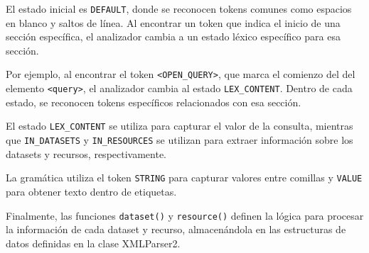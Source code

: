 
El estado inicial es \lstinline|DEFAULT|, donde se reconocen tokens comunes como espacios en blanco y saltos de línea. Al encontrar un token que indica el inicio de una sección específica, el analizador cambia a un estado léxico específico para esa sección.

Por ejemplo, al encontrar el token \lstinline|<OPEN_QUERY>|, que marca el comienzo del del elemento \lstinline|<query>|, el analizador cambia al estado \lstinline|LEX_CONTENT|. Dentro de cada estado, se reconocen tokens específicos relacionados con esa sección.

El estado \lstinline|LEX_CONTENT| se utiliza para capturar el valor de la consulta, mientras que \lstinline|IN_DATASETS| y \lstinline|IN_RESOURCES| se utilizan para extraer información sobre los datasets y recursos, respectivamente.


La gramática utiliza el token \lstinline|STRING| para capturar valores entre comillas y \lstinline|VALUE| para obtener texto dentro de etiquetas.

Finalmente, las funciones \lstinline|dataset()| y \lstinline|resource()| definen la lógica para procesar la información de cada dataset y recurso, almacenándola en las estructuras de datos definidas en la clase XMLParser2.

